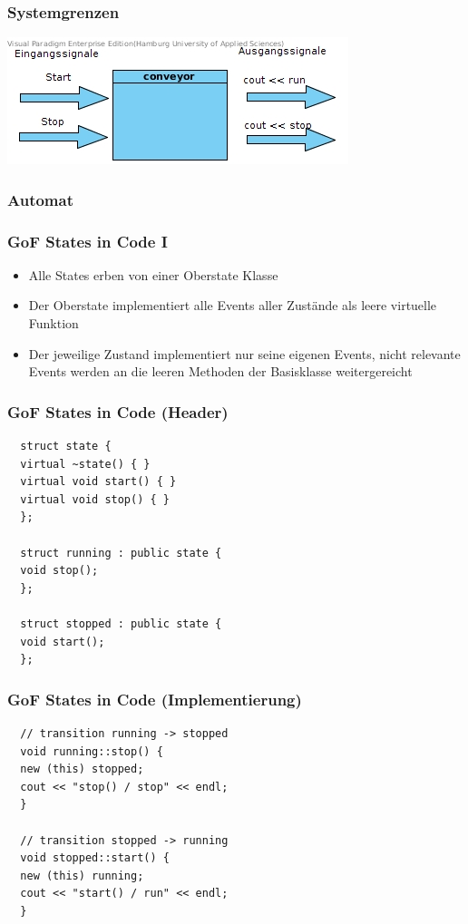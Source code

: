 \documentclass{beamer}
\begin{document}
\begin{frame}
 \frametitle{Systemgrenzen}
 \includegraphics[scale=.7]{img/Systemgrenzen_fsm_gof.jpg}
\end{frame}

\begin{frame}
 \frametitle{Automat}
\end{frame}

\begin{frame}
 \frametitle{GoF States in Code I}
 \begin{itemize}
  \item Alle States erben von einer Oberstate Klasse
  \item Der Oberstate implementiert alle Events aller Zust\"ande als leere virtuelle Funktion
  \item Der jeweilige Zustand implementiert nur seine eigenen Events, nicht relevante
  Events werden an die leeren Methoden der Basisklasse weitergereicht
 \end{itemize}
\end{frame}

\begin{frame}[fragile]
 \frametitle{GoF States in Code (Header)}
 \begin{lstlisting}
  struct state {
  virtual ~state() { }
  virtual void start() { }
  virtual void stop() { }
  };

  struct running : public state {
  void stop();
  };

  struct stopped : public state {
  void start();
  };
 \end{lstlisting}
\end{frame}

\begin{frame}[fragile]
 \frametitle{GoF States in Code (Implementierung)}
 \begin{lstlisting}
  // transition running -> stopped
  void running::stop() {
  new (this) stopped;
  cout << "stop() / stop" << endl;
  }

  // transition stopped -> running
  void stopped::start() {
  new (this) running;
  cout << "start() / run" << endl;
  }
 \end{lstlisting}
\end{frame}
\end{document}
